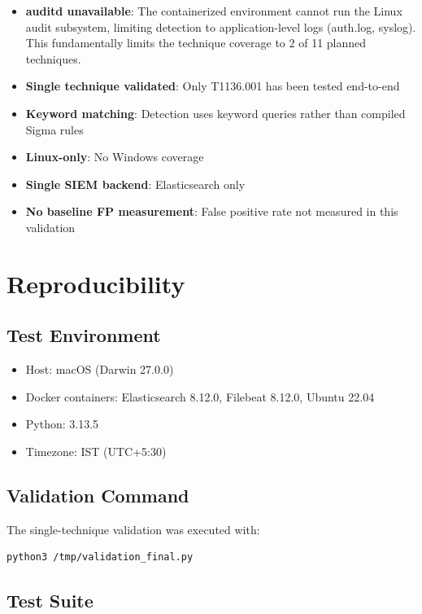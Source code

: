 \documentclass[11pt,a4paper]{article}
\begin{document}
\begin{itemize}
    \item \textbf{auditd unavailable}: The containerized environment cannot run the Linux audit subsystem, limiting detection to application-level logs (auth.log, syslog). This fundamentally limits the technique coverage to 2 of 11 planned techniques.
    \item \textbf{Single technique validated}: Only T1136.001 has been tested end-to-end
    \item \textbf{Keyword matching}: Detection uses keyword queries rather than compiled Sigma rules
    \item \textbf{Linux-only}: No Windows coverage
    \item \textbf{Single SIEM backend}: Elasticsearch only
    \item \textbf{No baseline FP measurement}: False positive rate not measured in this validation
\end{itemize}

\section{Reproducibility}

\subsection{Test Environment}

\begin{itemize}
    \item Host: macOS (Darwin 27.0.0)
    \item Docker containers: Elasticsearch 8.12.0, Filebeat 8.12.0, Ubuntu 22.04
    \item Python: 3.13.5
    \item Timezone: IST (UTC+5:30)
\end{itemize}

\subsection{Validation Command}

The single-technique validation was executed with:

\begin{lstlisting}[language=bash]
python3 /tmp/validation_final.py
\end{lstlisting}

\subsection{Test Suite}
\end{document}
